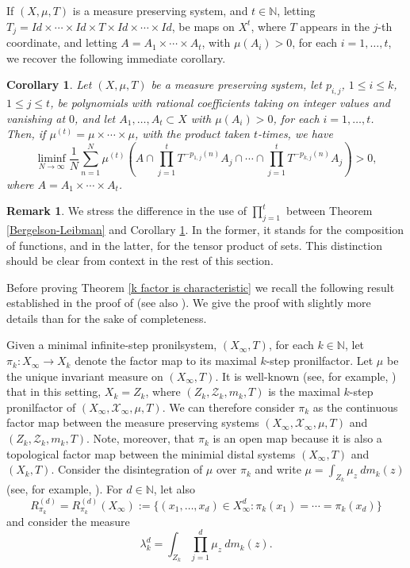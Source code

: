 \documentclass[reqno]{amsart}
\def\N{{\mathbb N}}
\newtheorem{corollary}[theorem]{Corollary}
\theoremstyle{definition}
\newtheorem*{remark*}{Remark}
\theoremstyle{remark}
\def\N{{\mathbb N}}
\begin{document}
If $(X,\mu,T)$ is a measure preserving system, and $t\in \N$, letting $T_j=Id \times \cdots \times Id \times T \times Id \times \cdots \times Id$, be maps on $X^t$, where $T$ appears in the $j$-th coordinate, and letting $A=A_1\times \cdots \times A_t$, with $\mu(A_i)>0$, for each $i=1,\ldots,t$, we recover the following immediate corollary. 

\begin{corollary}\label{Bergelson Leibman tensor product}
Let $(X,\mu,T)$ be a measure preserving system, let $p_{i,j}$, $1\leq i\leq k$, $1\leq j\leq t$, be polynomials with rational coefficients taking on integer values and vanishing at $0$, and let $A_1,\ldots,A_t\subset X$ with $\mu(A_i)>0$, for each $i=1,\ldots,t$. Then, if $\mu^{(t)}=\mu \times \cdots \times \mu$, with the product taken $t$-times, we have
$$\liminf_{N\to \infty}\frac{1}{N}\sum_{n=1}^N \mu^{(t)}\left( A \cap \prod_{j=1}^t T^{-p_{1,j}(n)}A_j\cap \cdots \cap \prod_{j=1}^t T^{-p_{k,j}(n)}A_j  \right)>0, $$
where $A=A_1\times \cdots \times A_t$.
\end{corollary}

\begin{remark*}
We stress the difference in the use of $\prod_{j=1}^t$ between Theorem \ref{Bergelson-Leibman} and Corollary \ref{Bergelson Leibman tensor product}. In the former, it stands for the composition of functions, and in the latter, for the tensor product of sets. This distinction should be clear from context in the rest of this section.
\end{remark*}

Before proving Theorem \ref{k factor is characteristic} we 
recall the following result established in the proof of \cite[Theorem 3.6]{Ye_Yu} (see 
also \cite[Theorem 5.9]{Glasner_Huang_Shao_Ye_regionally_arithmetic_prog_nil:2020}). We give the proof with slightly more details than \cite{Ye_Yu} for the sake of completeness. 

Given a minimal infinite-step pronilsystem, $(X_{\infty},T)$, for each $k\in \N$, let $\pi_k:X_{\infty}\to X_k$ denote the factor map to its maximal $k$-step pronilfactor. Let $\mu$ be the unique invariant measure on $(X_{\infty},T)$. It is well-known (see, for example, \cite[Lemma 8.3]{Dong_Donoso_Maass_Shao_Ye_infinite_step_nil:2013}) that in this setting, $X_k=Z_k$, where $(Z_k,\mathcal{Z}_k,m_k,T)$ is the maximal $k$-step pronilfactor of $(X_{\infty},\mathcal{X}_{\infty},\mu,T)$. We can therefore consider $\pi_k$ as the continuous factor map between the measure preserving systems $(X_{\infty},\mathcal{X}_{\infty},\mu,T)$ and  $(Z_k,\mathcal{Z}_k,m_k,T)$. Note, moreover, that $\pi_k$ is an open map because it is also a topological factor map between the minimial distal systems $(X_{\infty},T)$ and $(X_k,T)$. Consider the disintegration of $\mu$ over $\pi_k$ and write $\mu=\int_{Z_k} \mu_z\ dm_k(z)$ (see, for example, \cite[Theorem 5.14]{Einsiedler_Ward11}). For $d\in \N$, let also 
$$R^{(d)}_{\pi_k}=R^{(d)}_{\pi_k}(X_{\infty}):=\{(x_1,\ldots,x_d)\in X_{\infty}^d: \pi_k(x_1)=\cdots =\pi_k(x_d) \}$$
and consider the measure
$$\lambda^d_k=\int_{Z_k} \prod_{j=1}^d \mu_z\ dm_k(z).$$
\end{document}
